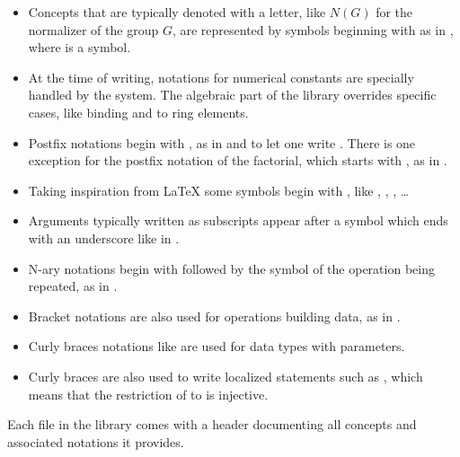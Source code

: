 \begin{itemize}
\item Concepts that are typically denoted with a letter, like $N(G)$ for the
	normalizer of the group $G$, are represented by symbols beginning
	with  as in , where  is a symbol.
\item At the time of writing, notations for numerical constants are specially
	handled by the system.  The algebraic part of the library overrides
	specific cases, like binding  and  to ring elements.
\item Postfix notations begin with , as in  and 
	to let one write . There is one exception for
        the postfix notation of the factorial, which starts with
        , as in .
\item Taking inspiration from \LaTeX{} some symbols begin with \C{\\},
	like \C{\\in}, \C{\\matrix}, \C{\\sum}, \ldots
\item Arguments typically written as subscripts appear after a symbol
	which ends with an underscore like  in .
\item N-ary notations begin with \C{[} followed by the symbol of the
	operation being repeated, as in .
\item Bracket notations are also used  for operations building data, as in
	\C{[seq .. | .. ]}.
\item Curly braces notations like  are used for data types
	with parameters.
\item Curly braces are also used to write localized statements
	such as ,
	which means that the restriction of  to  is injective.
\end{itemize}

Each file in the \mcbMC{} library comes with a header documenting
all concepts and associated notations it provides.

